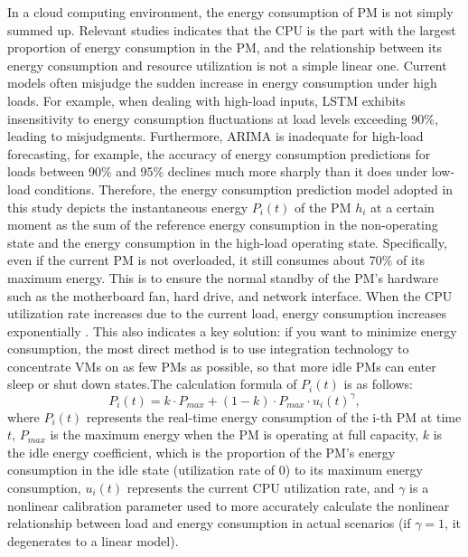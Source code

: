 \documentclass[conference]{{IEEEtran}}
\begin{document}
In a cloud computing environment, the energy consumption of PM is not simply summed up. Relevant studies indicates \cite{ilager2020thermal} that the CPU is the part with the largest proportion of energy consumption in the PM, and the relationship between its energy consumption and resource utilization is not a simple linear one. Current models often misjudge the sudden increase in energy consumption under high loads. For example, when dealing with high-load inputs, LSTM exhibits insensitivity to energy consumption fluctuations at load levels exceeding 90\%, leading to misjudgments. Furthermore, ARIMA \cite{contreras2003arima} is inadequate for high-load forecasting, for example, the accuracy of energy consumption predictions for loads between 90\% and 95\% declines much more sharply than it does under low-load conditions. Therefore, the energy consumption prediction model adopted in this study depicts the instantaneous energy $P_i(t)$ of the PM $h_{i}$ at a certain moment as the sum of the reference energy consumption \cite{zhao2018power}\cite{wang2024reconfigurable} in the non-operating state and the energy consumption in the high-load operating state. Specifically, even if the current PM is not overloaded, it still consumes about 70\% of its maximum energy. This is to ensure the normal standby of the PM's hardware such as the motherboard fan, hard drive, and network interface. When the CPU utilization rate increases due to the current load, energy consumption  increases exponentially \cite{zhao2018power}\cite{wang2024reconfigurable}. This also indicates a key solution: if you want to minimize energy consumption, the most direct method is to use integration technology to concentrate VMs on as few PMs as possible, so that more idle PMs can enter sleep or shut down states.The calculation formula of  $P_i(t)$ is as follows:\begin{equation}
    P_i(t) = k \cdot P_{max} + (1-k) \cdot P_{max} \cdot u_i(t)^\gamma,
\label{eq:power_model}
\end{equation}
where $P_i(t)$ represents the real-time energy consumption of the i-th PM at time $t$, $P_{max}$ is the maximum energy when the PM is operating at full capacity, $k$ is the idle energy coefficient, which is the proportion of the PM's energy consumption in the idle state (utilization rate of 0) to its maximum energy consumption, $u_i(t)$ represents the current CPU utilization rate, and $\gamma$ is a nonlinear calibration parameter used to more accurately calculate the nonlinear relationship between load and energy consumption in actual scenarios (if $\gamma=1$, it degenerates to a linear model).
\end{document}
